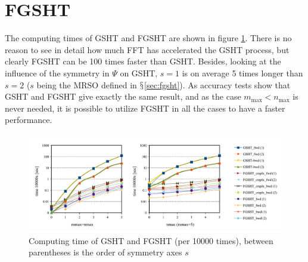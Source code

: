 \section{FGSHT}

The computing times of \acs{GSHT} and \acs{FGSHT} are shown in figure
\ref{fig:time-gsht-fgsht}. There is no reason to see in detail how
much \acs{FFT} has accelerated the \acs{GSHT} process, but clearly
\acs{FGSHT} can be 100 times faster than \acs{GSHT}. Besides, looking
at the influence of the symmetry in $\Psi$ on \acs{GSHT}, $s=1$
is on average 5 times longer than $s=2$ ($s$ being the \acs{MRSO}
defined in $\mathsection$\ref{sec:fgsht}). As accuracy tests show
that \acs{GSHT} and \acs{FGSHT} give exactly the same result, and
as the case $m_{\max}<n_{\max}$ is never needed, it is possible to
utilize \acs{FGSHT} in all the cases to have a faster performance.
\begin{center}
\begin{figure}[H]
\begin{centering}
\includegraphics[bb=0bp 20bp 731bp 263bp,width=1\columnwidth]{_figure/results/fgsht_perf}
\par\end{centering}
\caption[Computing time of \acs{GSHT} and \acs{FGSHT}]{Computing time of \acs{GSHT} and \acs{FGSHT} (per 10000 times),
between parentheses is the order of symmetry axes $s$\label{fig:time-gsht-fgsht}}
\end{figure}
\par\end{center}

